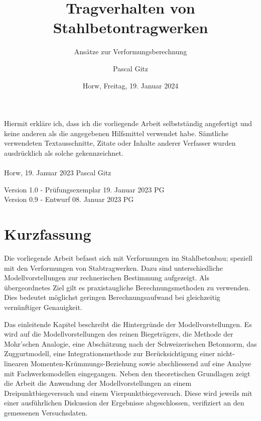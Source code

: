 \documentclass[
  12pt,
  letterpaper,
  egregdoesnotlikesansseriftitles]{scrreprt}
\title{Tragverhalten von Stahlbetontragwerken}
\subtitle
{Ansätze zur Verformungsberechnung}
\date{\large Horw, Freitag, 19. Januar 2024}
\author{Pascal Gitz}
\begin{document}
\maketitle

Hiermit erkläre ich, dass ich die vorliegende Arbeit selbstständig angefertigt und keine anderen als die angegebenen Hilfsmittel verwendet habe. Sämtliche verwendeten Textausschnitte, Zitate oder Inhalte anderer Verfasser wurden ausdrücklich als solche gekennzeichnet.\\%
%
\\%
%
Horw, 19. Januar 2023 \hfill Pascal Gitz%

\vfill

Version 1.0 - Prüfungsexemplar \hfill 19. Januar 2023 \quad \quad \quad \quad \quad PG\\
Version 0.9 - Entwurf \hfill 08. Januar 2023 \quad \quad \quad \quad \quad PG\\

\newpage

\chapter*{Kurzfassung}

Die vorliegende Arbeit befasst sich mit Verformungen im Stahlbetonbau; speziell mit den Verformungen von Stabtragwerken. Dazu sind unterschiedliche Modellvorstellungen zur rechnerischen Bestimmung aufgezeigt. Als übergeordnetes Ziel gilt es praxistaugliche Berechnungsmethoden zu verwenden. Dies bedeutet möglichst geringen Berechnungsaufwand bei gleichzeitig vernünftiger Genauigkeit.  

Das einleitende Kapitel beschreibt die Hintergründe der Modellvorstellungen. Es wird auf die Modellvorstellungen des reinen Biegeträgers, die Methode der Mohr'schen Analogie, eine Abschätzung nach der Schweizerischen Betonnorm, das Zuggurtmodell, eine Integrationsmethode zur Berücksichtigung einer nicht-linearen Momenten-Krümmungs-Beziehung sowie abschliessend auf eine Analyse mit Fachwerksmodellen eingegangen. Neben den theoretischen Grundlagen zeigt die Arbeit die Anwendung der Modellvorstellungen an einem Dreipunktbiegeversuch und einem Vierpunktbiegeversuch. Diese wird jeweils mit einer ausführlichen Diskussion der Ergebnisse abgeschlossen, verifiziert an den gemessenen Versuchsdaten. 
\end{document}
